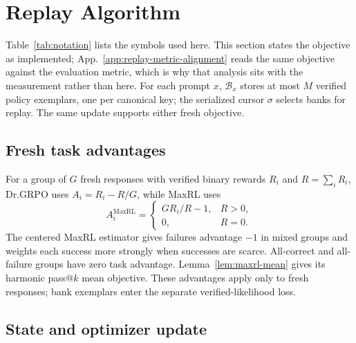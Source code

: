 \documentclass{article}
\newcommand{\1}{\mathbf 1}
\theoremstyle{remark}
\theoremstyle{definition}
\theoremstyle{plain}
\begin{document}
\section{Replay Algorithm}
\label{app:algorithm}

Table~\ref{tab:notation} lists the symbols used here. This section states the
objective as implemented; App.~\ref{app:replay-metric-alignment} reads the same
objective against the evaluation metric, which is why that analysis sits with
the measurement rather than here.
For each prompt $x$, $\mathcal B_x$ stores at most $M$ verified policy
exemplars, one per canonical key; the serialized cursor $\sigma$ selects
banks for replay. The same update supports either fresh objective.


\subsection{Fresh task advantages}
\label{app:binary-maxrl}

For a group of $G$ fresh responses with verified binary rewards $R_i$ and
$R=\sum_i R_i$, Dr.GRPO uses $A_i=R_i-R/G$, while MaxRL uses
\[
 A_i^{\mathrm{MaxRL}}=
 \begin{cases}
 G R_i/R-1, & R>0,\\
 0, & R=0.
 \end{cases}
\]
The centered MaxRL estimator \citep{tajwar2026maxrl} gives failures advantage
$-1$ in mixed groups and weights each success more strongly when successes
are scarce. All-correct and all-failure groups have zero task advantage.
Lemma~\ref{lem:maxrl-mean} gives its harmonic pass@\(k\) mean objective.
These advantages apply only to fresh responses; bank exemplars enter the
separate verified-likelihood loss.

\subsection{State and optimizer update}
\label{app:algorithm-update}
\end{document}
